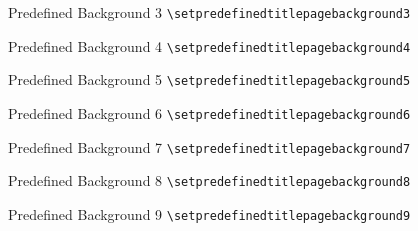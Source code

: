 \documentclass[english,sectioncirclenumberstyle]{ciadbeamer}
\begin{document}
\begin{frame}{{Predefined Background} 3}
	\centering\texttt{{\textbackslash}setpredefinedtitlepagebackground3} \\[.5cm]
\end{frame}

\begin{frame}{{Predefined Background} 4}
	\centering\texttt{{\textbackslash}setpredefinedtitlepagebackground4} \\[.5cm]
\end{frame}

\begin{frame}{{Predefined Background} 5}
	\centering\texttt{{\textbackslash}setpredefinedtitlepagebackground5} \\[.5cm]
\end{frame}

\begin{frame}{{Predefined Background} 6}
	\centering\texttt{{\textbackslash}setpredefinedtitlepagebackground6} \\[.5cm]
\end{frame}

\begin{frame}{{Predefined Background} 7}
	\centering\texttt{{\textbackslash}setpredefinedtitlepagebackground7} \\[.5cm]
\end{frame}

\begin{frame}{{Predefined Background} 8}
	\centering\texttt{{\textbackslash}setpredefinedtitlepagebackground8} \\[.5cm]
\end{frame}

\begin{frame}{{Predefined Background} 9}
	\centering\texttt{{\textbackslash}setpredefinedtitlepagebackground9} \\[.5cm]
\end{frame}
\end{document}
